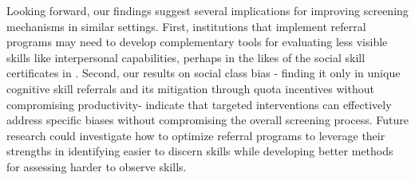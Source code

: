 \documentclass[11pt,a4paper,oneside]{article}
\begin{document}
  Looking forward, our findings suggest several implications for improving screening mechanisms in similar settings. First, institutions that implement referral programs may need to develop complementary tools for evaluating less visible skills like interpersonal capabilities, perhaps in the likes of the social skill certificates in \citet{bassi2022screening}. Second, our results on social class bias - finding it only in unique cognitive skill referrals and its mitigation through quota incentives without compromising productivity- indicate that targeted interventions can effectively address specific biases without compromising the overall screening process. Future research could investigate how to optimize referral programs to leverage their strengths in identifying easier to discern skills while developing better methods for assessing harder to observe skills.
  

  
\end{document}
